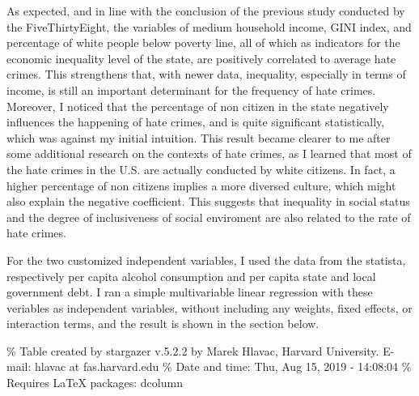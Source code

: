 \documentclass[]{article}
\begin{document}
As expected, and in line with the conclusion of the previous study
conducted by the FiveThirtyEight, the variables of medium household
income, GINI index, and percentage of white people below poverty line,
all of which as indicators for the economic inequality level of the
state, are positively correlated to average hate crimes. This
strengthens that, with newer data, inequality, especially in terms of
income, is still an important determinant for the frequency of hate
crimes. Moreover, I noticed that the percentage of non citizen in the
state negatively influences the happening of hate crimes, and is quite
significant statistically, which was against my initial intuition. This
result became clearer to me after some additional research on the
contexts of hate crimes, as I learned that most of the hate crimes in
the U.S. are actually conducted by white citizens. In fact, a higher
percentage of non citizens implies a more diversed culture, which might
also explain the negative coefficient. This suggests that inequality in
social status and the degree of inclusiveness of social enviroment are
also related to the rate of hate crimes.

For the two customized independent variables, I used the data from the
statista, respectively per capita alcohol consumption and per capita
state and local government debt. I ran a simple multivariable linear
regression with these veriables as independent variables, without
including any weights, fixed effects, or interaction terms, and the
result is shown in the section below.

\% Table created by stargazer v.5.2.2 by Marek Hlavac, Harvard
University. E-mail: hlavac at fas.harvard.edu \% Date and time: Thu, Aug
15, 2019 - 14:08:04 \% Requires LaTeX packages: dcolumn
\end{document}
